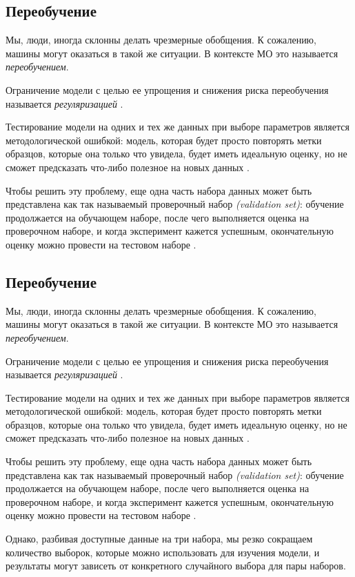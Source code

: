\subsection{Переобучение}
Мы, люди, иногда склонны делать чрезмерные обобщения. К сожалению,
машины могут оказаться в такой же ситуации. В контексте МО это называется
\emph{переобучением}.

Ограничение модели с целью ее упрощения и снижения риска переобучения
называется \emph{регуляризацией} \cite{scikitBook}.

Тестирование модели на одних и тех же данных при выборе параметров является
методологической ошибкой: модель, которая будет просто повторять метки
образцов, которые она только что увидела, будет иметь идеальную оценку, но
не сможет предсказать что-либо полезное на новых данных \cite{scikitTuning}.

Чтобы решить эту проблему, еще одна часть набора данных может быть представлена
как так называемый проверочный набор \emph{(validation set)}: обучение продолжается
на обучающем наборе, после чего выполняется оценка на проверочном наборе, и
когда эксперимент кажется успешным, окончательную оценку можно провести на
тестовом наборе \cite{scikitCV}.

\subsection{Переобучение}
Мы, люди, иногда склонны делать чрезмерные обобщения. К сожалению,
машины могут оказаться в такой же ситуации. В контексте МО это называется
\emph{переобучением}.

Ограничение модели с целью ее упрощения и снижения риска переобучения
называется \emph{регуляризацией} \cite{scikitBook}.

Тестирование модели на одних и тех же данных при выборе параметров является
методологической ошибкой: модель, которая будет просто повторять метки
образцов, которые она только что увидела, будет иметь идеальную оценку, но
не сможет предсказать что-либо полезное на новых данных \cite{scikitTuning}.

Чтобы решить эту проблему, еще одна часть набора данных может быть представлена
как так называемый проверочный набор \emph{(validation set)}: обучение продолжается
на обучающем наборе, после чего выполняется оценка на проверочном наборе, и
когда эксперимент кажется успешным, окончательную оценку можно провести на
тестовом наборе \cite{scikitCV}.

Однако, разбивая доступные данные на три набора, мы резко сокращаем количество
выборок, которые можно использовать для изучения модели, и результаты могут
зависеть от конкретного случайного выбора для пары наборов.

